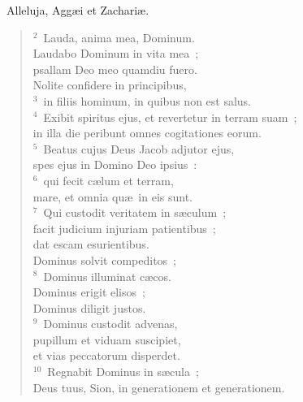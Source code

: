 ~\lettrine[lines=10,image=true,loversize=0.05,lraise=-0.03]{A}{}lleluja, Agg\ae i et Zachari\ae .
\begin{flushleft}\begin{verse}\vspace{6pt}${}^{2}$~Lauda, anima mea, Dominum.\\ Laudabo Dominum in vita mea~;\\ psallam Deo meo quamdiu fuero.\\ Nolite confidere in principibus,\\
${}^{3}$~in filiis hominum, in quibus non est salus.\\
${}^{4}$~Exibit spiritus ejus, et revertetur in terram suam~;\\ in illa die peribunt omnes cogitationes eorum.\\
${}^{5}$~Beatus cujus Deus Jacob adjutor ejus,\\ spes ejus in Domino Deo ipsius~:\\
${}^{6}$~qui fecit c\ae lum et terram,\\ mare, et omnia qu\ae\ in eis sunt.\\
${}^{7}$~Qui custodit veritatem in s\ae culum~;\\ facit judicium injuriam patientibus~;\\ dat escam esurientibus.\\ Dominus solvit compeditos~;\\
${}^{8}$~Dominus illuminat c\ae cos.\\ Dominus erigit elisos~;\\ Dominus diligit justos.\\
${}^{9}$~Dominus custodit advenas,\\ pupillum et viduam suscipiet,\\ et vias peccatorum disperdet.\\
${}^{10}$~Regnabit Dominus in s\ae cula~;\\ Deus tuus, Sion, in generationem et generationem.\end{verse}\end{flushleft}


